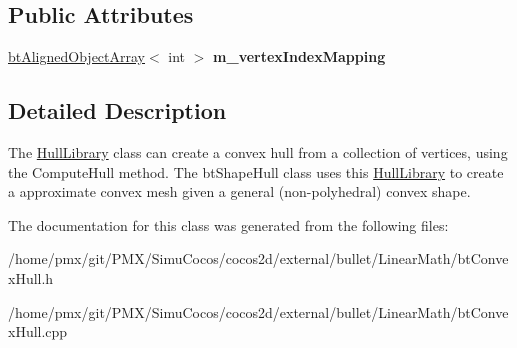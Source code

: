 \subsection*{Public Attributes}
\begin{DoxyCompactItemize}
\item 
\mbox{\label{classHullLibrary_a2fbbde0a231a681f4a84ab4c03fe083c}} 
\hyperlink{classbtAlignedObjectArray}{bt\+Aligned\+Object\+Array}$<$ int $>$ {\bfseries m\+\_\+vertex\+Index\+Mapping}
\end{DoxyCompactItemize}


\subsection{Detailed Description}
The \hyperlink{classHullLibrary}{Hull\+Library} class can create a convex hull from a collection of vertices, using the Compute\+Hull method. The bt\+Shape\+Hull class uses this \hyperlink{classHullLibrary}{Hull\+Library} to create a approximate convex mesh given a general (non-\/polyhedral) convex shape. 

The documentation for this class was generated from the following files\+:\begin{DoxyCompactItemize}
\item 
/home/pmx/git/\+P\+M\+X/\+Simu\+Cocos/cocos2d/external/bullet/\+Linear\+Math/bt\+Convex\+Hull.\+h\item 
/home/pmx/git/\+P\+M\+X/\+Simu\+Cocos/cocos2d/external/bullet/\+Linear\+Math/bt\+Convex\+Hull.\+cpp\end{DoxyCompactItemize}
